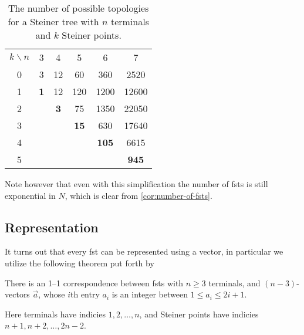 \begin{table}[htbp]
  \centering
  \begin{tabular}{cccccc}
    \toprule
    $k \backslash n$ & 3    & 4    & 5     & 6      & 7      \\
    \hhline{~-----}
    0   & 3          & 12         & 60          & 360          & 2520         \\
    1   & \textbf{1} & 12         & 120         & 1200         & 12600        \\
    2   &            & \textbf{3} & 75          & 1350         & 22050        \\
    3   &            &            & \textbf{15} & 630          & 17640        \\
    4   &            &            &             & \textbf{105} & 6615         \\
    5   &            &            &             &              & \textbf{945} \\
    \bottomrule
  \end{tabular}
  \caption[Number of possible topologies]{The number of possible topologies for a Steiner tree with $n$
    terminals and $k$ Steiner points.\label{tab:number-of-topologies}}
\end{table}

Note however that even with this simplification the number of \acp{fst} is
still exponential in $N$, which is clear from \cref{cor:number-of-fsts}.

\subsection{Representation}
\label{sec:representation}

It turns out that every \ac{fst} can be represented using a vector, in
particular we utilize the following theorem put forth by \textcite{smith1992}

\begin{theorem}
  There is an 1--1 correspondence between \acp{fst} with $n \ge 3$ terminals,
  and $(n-3)$-vectors $\vec{a}$, whose $i$th entry $a_i$ is an integer between
  $1 \le a_i \le 2 i + 1$.
\end{theorem}

Here terminals have indicies $1, 2, \ldots, n$, and Steiner points have indicies
$n + 1, n + 2, \ldots, 2 n - 2$.

